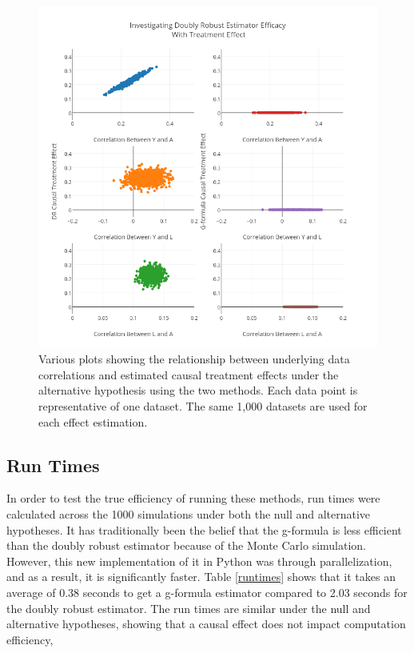 \begin{figure}[h!]
\includegraphics[width = \linewidth]{figures/correlation2.png}
\caption[Scatterplots of relationships between estimates and data correlations under the alternative hypothesis]{Various plots showing the relationship between underlying data correlations and estimated causal treatment effects under the alternative hypothesis using the two methods.  Each data point is representative of one dataset.  The same 1,000 datasets are used for each effect estimation.}
\label{correlation2}
\end{figure}


\newpage
\subsection{Run Times} 
In order to test the true efficiency of running these methods, run times were calculated across the 1000 simulations under both the null and alternative hypotheses.  It has traditionally been the belief that the g-formula is less efficient than the doubly robust estimator because of the Monte Carlo simulation.  However, this new implementation of it in Python was through parallelization, and as a result, it is significantly faster.  Table \ref{runtimes} shows that it takes an average of 0.38 seconds to get a g-formula estimator compared to 2.03 seconds for the doubly robust estimator.  The run times are similar under the null and alternative hypotheses, showing that a causal effect does not impact computation efficiency,  

